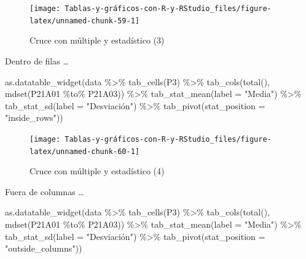 \documentclass[
]{book}
\newenvironment{Shaded}{\begin{snugshade}}{\end{snugshade}}
\newcommand{\AttributeTok}[1]{\textcolor[rgb]{0.77,0.63,0.00}{#1}}
\newcommand{\FunctionTok}[1]{\textcolor[rgb]{0.00,0.00,0.00}{#1}}
\newcommand{\NormalTok}[1]{#1}
\newcommand{\SpecialCharTok}[1]{\textcolor[rgb]{0.00,0.00,0.00}{#1}}
\newcommand{\StringTok}[1]{\textcolor[rgb]{0.31,0.60,0.02}{#1}}
\begin{document}
\begin{figure}[H]

{\centering \texttt{[image: Tablas-y-gráficos-con-R-y-RStudio\_files/figure-latex/unnamed-chunk-59-1]} 

}

\caption{Cruce con múltiple y estadístico (3)}\label{fig:unnamed-chunk-59}
\end{figure}

Dentro de filas \ldots{}

\begin{Shaded}
\begin{Highlighting}[]
\FunctionTok{as.datatable\_widget}\NormalTok{(data }\SpecialCharTok{\%\textgreater{}\%} \FunctionTok{tab\_cells}\NormalTok{(P3) }\SpecialCharTok{\%\textgreater{}\%} \FunctionTok{tab\_cols}\NormalTok{(}\FunctionTok{total}\NormalTok{(), }
  \FunctionTok{mdset}\NormalTok{(P21A01 }\SpecialCharTok{\%to\%}\NormalTok{ P21A03)) }\SpecialCharTok{\%\textgreater{}\%} \FunctionTok{tab\_stat\_mean}\NormalTok{(}\AttributeTok{label =} \StringTok{"Media"}\NormalTok{) }\SpecialCharTok{\%\textgreater{}\%} 
  \FunctionTok{tab\_stat\_sd}\NormalTok{(}\AttributeTok{label =} \StringTok{"Desviación"}\NormalTok{) }\SpecialCharTok{\%\textgreater{}\%} \FunctionTok{tab\_pivot}\NormalTok{(}\AttributeTok{stat\_position =} \StringTok{"inside\_rows"}\NormalTok{))}
\end{Highlighting}
\end{Shaded}

\begin{figure}[H]

{\centering \texttt{[image: Tablas-y-gráficos-con-R-y-RStudio\_files/figure-latex/unnamed-chunk-60-1]} 

}

\caption{Cruce con múltiple y estadístico (4)}\label{fig:unnamed-chunk-60}
\end{figure}

Fuera de columnas \ldots{}

\begin{Shaded}
\begin{Highlighting}[]
\FunctionTok{as.datatable\_widget}\NormalTok{(data }\SpecialCharTok{\%\textgreater{}\%} \FunctionTok{tab\_cells}\NormalTok{(P3) }\SpecialCharTok{\%\textgreater{}\%} \FunctionTok{tab\_cols}\NormalTok{(}\FunctionTok{total}\NormalTok{(), }
  \FunctionTok{mdset}\NormalTok{(P21A01 }\SpecialCharTok{\%to\%}\NormalTok{ P21A03)) }\SpecialCharTok{\%\textgreater{}\%} \FunctionTok{tab\_stat\_mean}\NormalTok{(}\AttributeTok{label =} \StringTok{"Media"}\NormalTok{) }\SpecialCharTok{\%\textgreater{}\%} 
  \FunctionTok{tab\_stat\_sd}\NormalTok{(}\AttributeTok{label =} \StringTok{"Desviación"}\NormalTok{) }\SpecialCharTok{\%\textgreater{}\%} \FunctionTok{tab\_pivot}\NormalTok{(}\AttributeTok{stat\_position =} \StringTok{"outside\_columns"}\NormalTok{))}
\end{Highlighting}
\end{Shaded}
\end{document}
